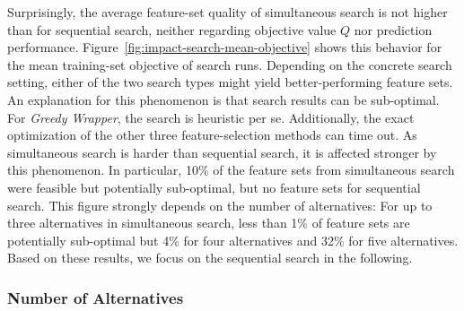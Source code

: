\documentclass{article}
\theoremstyle{definition}
\begin{document}
Surprisingly, the average feature-set quality of simultaneous search is not higher than for sequential search, neither regarding objective value $Q$ nor prediction performance.
Figure~\ref{fig:impact-search-mean-objective} shows this behavior for the mean training-set objective of search runs.
Depending on the concrete search setting, either of the two search types might yield better-performing feature sets.
An explanation for this phenomenon is that search results can be sub-optimal.
For \emph{Greedy Wrapper}, the search is heuristic per se.
Additionally, the exact optimization of the other three feature-selection methods can time out.
As simultaneous search is harder than sequential search, it is affected stronger by this phenomenon.
In particular, 10\% of the feature sets from simultaneous search were feasible but potentially sub-optimal, but no feature sets for sequential search.
This figure strongly depends on the number of alternatives:
For up to three alternatives in simultaneous search, less than 1\% of feature sets are potentially sub-optimal but 4\% for four alternatives and 32\% for five alternatives.
Based on these results, we focus on the sequential search in the following.

\subsubsection{Number of Alternatives}
\label{sec:evaluation:search:num-alternatives}
\end{document}
